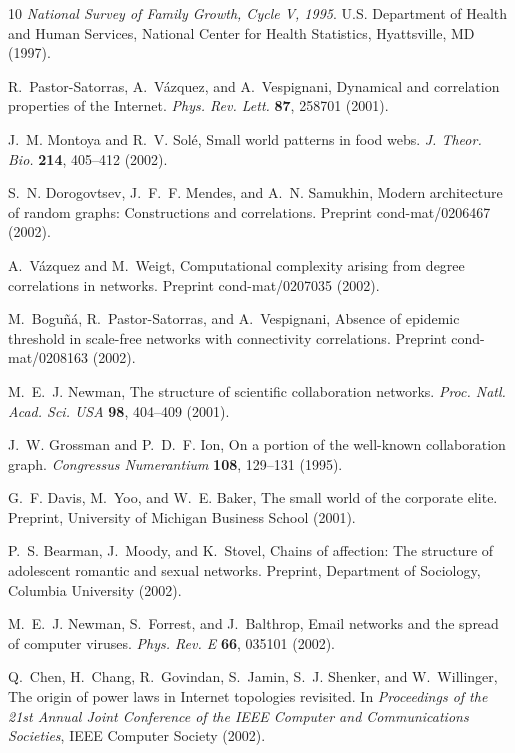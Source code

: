 \documentclass[twocolumn,pre]{revtex4}
\begin{document}
\begin{thebibliography}{10}
\textit{National Survey of Family Growth, Cycle V, 1995}. U.S. Department of
  Health and Human Services, National Center for Health Statistics,
  Hyattsville, MD (1997).

R.~Pastor-Satorras, A.~V\'azquez, and A.~Vespignani, Dynamical and correlation
  properties of the {I}nternet. \textit{Phys. Rev. Lett.} \textbf{87}, 258701
  (2001).

J.~M. Montoya and R.~V. Sol\'e, Small world patterns in food webs. \textit{J.
  Theor. Bio.} \textbf{214}, 405--412 (2002).

S.~N. Dorogovtsev, J.~F.~F. Mendes, and A.~N. Samukhin, Modern architecture of
  random graphs: Constructions and correlations. Preprint cond-mat/0206467
  (2002).

A.~V\'azquez and M.~Weigt, Computational complexity arising from degree
  correlations in networks. Preprint cond-mat/0207035 (2002).

M.~Bogu{\~n}\'a, R.~Pastor-Satorras, and A.~Vespignani, Absence of epidemic
  threshold in scale-free networks with connectivity correlations. Preprint
  cond-mat/0208163 (2002).

M.~E.~J. Newman, The structure of scientific collaboration networks.
  \textit{Proc. Natl. Acad. Sci. USA} \textbf{98}, 404--409 (2001).

J.~W. Grossman and P.~D.~F. Ion, On a portion of the well-known collaboration
  graph. \textit{Congressus Numerantium} \textbf{108}, 129--131 (1995).

G.~F. Davis, M.~Yoo, and W.~E. Baker, The small world of the corporate elite.
  Preprint, University of Michigan Business School (2001).

P.~S. Bearman, J.~Moody, and K.~Stovel, Chains of affection: The structure of
  adolescent romantic and sexual networks. Preprint, Department of Sociology,
  Columbia University (2002).

M.~E.~J. Newman, S.~Forrest, and J.~Balthrop, Email networks and the spread of
  computer viruses. \textit{Phys. Rev. E} \textbf{66}, 035101 (2002).

Q.~Chen, H.~Chang, R.~Govindan, S.~Jamin, S.~J. Shenker, and W.~Willinger, The
  origin of power laws in {I}nternet topologies revisited. In
  \textit{Proceedings of the 21st Annual Joint Conference of the {IEEE}
  Computer and Communications Societies}, IEEE Computer Society (2002).


\end{thebibliography}
\end{document}
